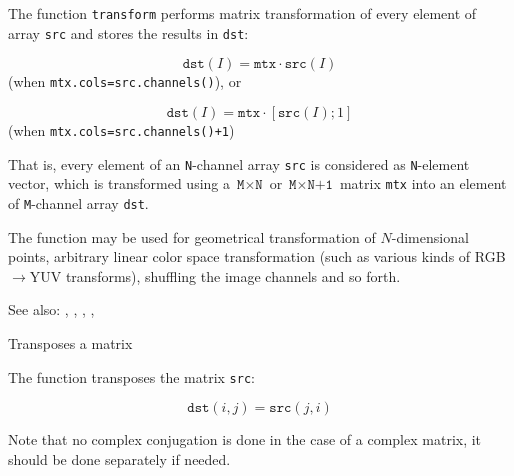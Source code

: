 The function \texttt{transform} performs matrix transformation of every element of array \texttt{src} and stores the results in \texttt{dst}:

\[
\texttt{dst}(I) = \texttt{mtx} \cdot \texttt{src}(I)
\]
(when \texttt{mtx.cols=src.channels()}), or

\[
\texttt{dst}(I) = \texttt{mtx} \cdot [\texttt{src}(I); 1]
\]
(when \texttt{mtx.cols=src.channels()+1})

That is, every element of an \texttt{N}-channel array \texttt{src} is
considered as \texttt{N}-element vector, which is transformed using
a $\texttt{M} \times \texttt{N}$ or $\texttt{M} \times \texttt{N+1}$ matrix \texttt{mtx} into
an element of \texttt{M}-channel array \texttt{dst}.

The function may be used for geometrical transformation of $N$-dimensional
points, arbitrary linear color space transformation (such as various kinds of RGB$\rightarrow$YUV transforms), shuffling the image channels and so forth.

See also: , , , , 

Transposes a matrix

\begin{description}
\end{description}

The function  transposes the matrix \texttt{src}:

\[ \texttt{dst}(i,j) = \texttt{src}(j,i) \]

Note that no complex conjugation is done in the case of a complex
matrix, it should be done separately if needed.

\fi
